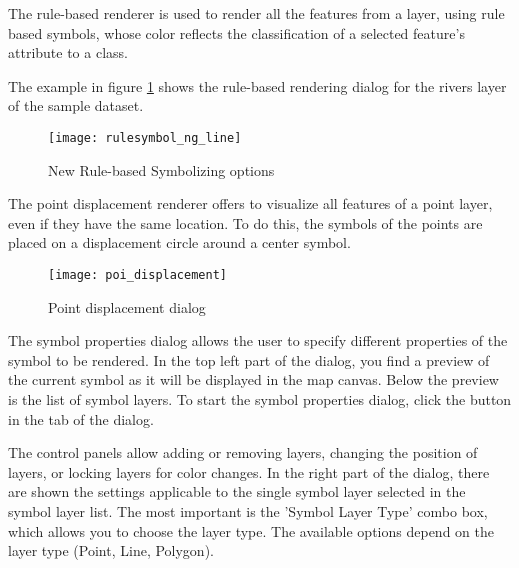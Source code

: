 The rule-based renderer is used to render all the features from a layer, using
rule based symbols, whose color reflects the classification of a selected
feature's attribute to a class.

The example in figure \ref{fig:rulesymNG} shows the rule-based rendering dialog
for the rivers layer of the \qg sample dataset.

\begin{figure}[ht]
   \centering
   \texttt{[image: rulesymbol\_ng\_line]}
   \caption{New Rule-based Symbolizing options \nixcaption}\label{fig:rulesymNG}
\end{figure}


The point displacement renderer offers to visualize all features of a point
layer, even if they have the same location. To do this, the symbols of the
points are placed on a displacement circle around a center symbol.

\begin{figure}[ht]
   \centering
   \texttt{[image: poi\_displacement]}
   \caption{Point displacement dialog \nixcaption}\label{fig:poidissymNG}
\end{figure}


The symbol properties dialog allows the user to specify different properties of
the symbol to be rendered. In the top left part of the dialog, you find a preview
of the current symbol as it will be displayed in the map canvas. Below the preview
is the list of symbol layers. To start the symbol properties dialog, click the
 button in the  tab of the
 dialog.

The control panels allow adding or removing layers, changing the position of layers,
or locking layers for color changes. In the right part of the dialog, there are
shown the settings applicable to the single symbol layer selected in the symbol
layer list. The most important is the 'Symbol Layer Type' combo box, which allows
you to choose the layer type. The available options depend on the layer type
(Point, Line, Polygon).

